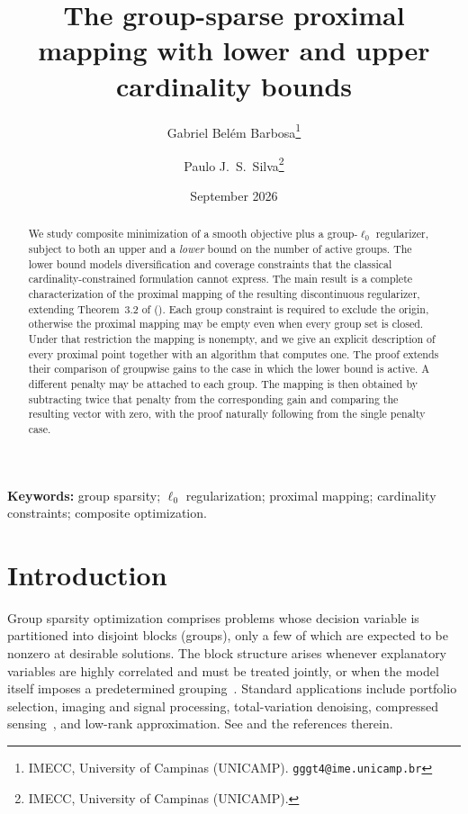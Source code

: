 \documentclass[11pt,a4paper]{article}
\title{The group-sparse proximal mapping with lower and upper cardinality bounds}
\author{Gabriel Belém Barbosa\thanks{IMECC, University of Campinas (UNICAMP).
\texttt{gggt4@ime.unicamp.br}}
\and Paulo J.\ S.\ Silva\thanks{IMECC, University of Campinas (UNICAMP).}}
\date{September 2026}
\theoremstyle{plain}
\theoremstyle{definition}
\theoremstyle{remark}
\begin{document}
\maketitle

\begin{abstract}
  We study composite minimization of a smooth objective plus a group-\(\ell_0\) regularizer, subject to both an upper and a \emph{lower} bound on the number of active groups.
  The lower bound models diversification and coverage constraints that the classical cardinality-constrained formulation cannot express.
  The main result is a complete characterization of the proximal mapping of the resulting discontinuous regularizer, extending Theorem~3.2 of \citeauthor{beck2018} (\citeyear{beck2018}).
  Each group constraint is required to exclude the origin, otherwise the proximal mapping may be empty even when every group set is closed.
  Under that restriction the mapping is nonempty, and we give an explicit description of every proximal point together with an algorithm that computes one.
  The proof extends their comparison of groupwise gains to the case in which the lower bound is active.
  A different penalty may be attached to each group.
  The mapping is then obtained by subtracting twice that penalty from the corresponding gain and comparing the resulting vector with zero, with the proof naturally following from the single penalty case.
\end{abstract}

\noindent\textbf{Keywords:}
group sparsity; \(\ell_0\) regularization; proximal mapping; cardinality
constraints; composite optimization.

\section{Introduction}
\label{sec:intro}

Group sparsity optimization comprises problems whose decision variable is partitioned into disjoint blocks (groups), only a few of which are expected to be nonzero at desirable solutions.
The block structure arises whenever explanatory variables are highly correlated and must be treated jointly, or when the model itself imposes a predetermined grouping~\cite{yuan2006,simon2013,beck2018}.
Standard applications include portfolio selection, imaging and signal processing, total-variation denoising, compressed sensing~\cite{donoho2006}, and low-rank approximation.
See \cite{beck2018} and the references therein.
\end{document}
